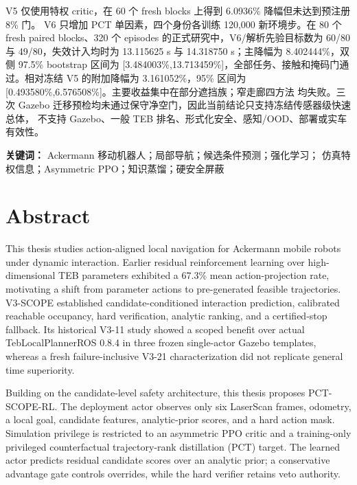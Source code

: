 \documentclass[12pt,a4paper,oneside]{report}
\begin{document}
V5 仅使用特权 critic，在 60 个 fresh blocks 上得到 6.0936\% 降幅但未达到预注册 8\% 门。
V6 只增加 PCT 单因素，四个身份各训练 120,000 新环境步。在 80 个 fresh paired blocks、320 个
episodes 的正式研究中，V6/解析先验目标数为 60/80 与 49/80，失效计入均时为 13.115625 s 与
14.318750 s；主降幅为 8.402444\%，双侧 97.5\% bootstrap 区间为
[3.484003\%,13.713459\%]，全部任务、接触和掩码门通过。相对冻结 V5 的附加降幅为
3.161052\%，95\% 区间为 [0.493580\%,6.576508\%]。主要收益集中在部分遮挡族；窄走廊四方法
均失败。三次 Gazebo 迁移预检均未通过保守净空门，因此当前结论只支持冻结传感器级快速总体，
不支持 Gazebo、一般 TEB 排名、形式化安全、感知/OOD、部署或实车有效性。

\noindent\textbf{关键词：} Ackermann 移动机器人；局部导航；候选条件预测；强化学习；
仿真特权信息；Asymmetric PPO；知识蒸馏；硬安全屏蔽

\chapter*{Abstract}
This thesis studies action-aligned local navigation for Ackermann mobile robots under dynamic
interaction. Earlier residual reinforcement learning over high-dimensional TEB parameters
exhibited a 67.3\% mean action-projection rate, motivating a shift from parameter actions to
pre-generated feasible trajectories. V3-SCOPE established candidate-conditioned interaction
prediction, calibrated reachable occupancy, hard verification, analytic ranking, and a
certified-stop fallback. Its historical V3-11 study showed a scoped benefit over actual
TebLocalPlannerROS 0.8.4 in three frozen single-actor Gazebo templates, whereas a fresh
failure-inclusive V3-21 characterization did not replicate general time superiority.

Building on the candidate-level safety architecture, this thesis proposes PCT-SCOPE-RL. The
deployment actor observes only six LaserScan frames, odometry, a local goal, candidate features,
analytic-prior scores, and a hard action mask. Simulation privilege is restricted to an
asymmetric PPO critic and a training-only privileged counterfactual trajectory-rank distillation
(PCT) target. The learned actor predicts residual candidate scores over an analytic prior; a
conservative advantage gate controls overrides, while the hard verifier retains veto authority.
\end{document}
